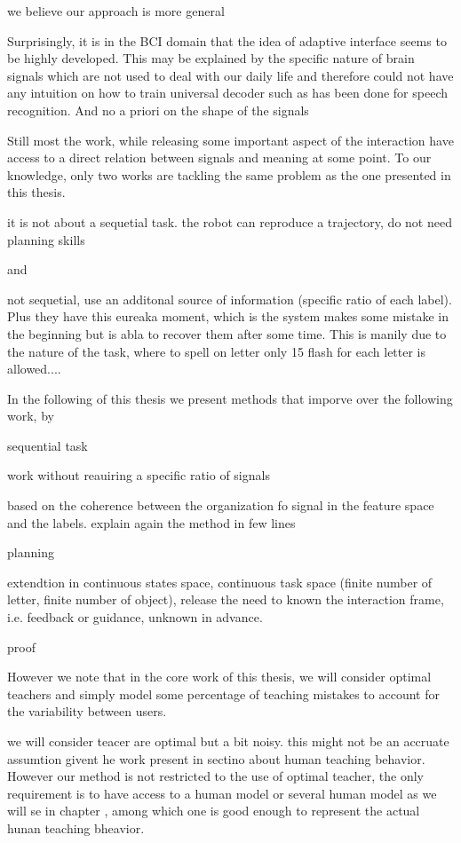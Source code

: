 we believe our approach is more general

Surprisingly, it is in the BCI domain that the idea of adaptive interface seems to be highly developed. This may be explained by the specific nature of brain signals which are not used to deal with our daily life and therefore could not have any intuition on how to train universal decoder such as has been done for speech recognition. And no a priori on the shape of the signals

Still most the work, while releasing some important aspect of the interaction have access to a direct relation between signals and meaning at some point. To our knowledge, only two works are tackling the same problem as the one presented in this thesis.

 
\cite{cederborg2011imitating}
it is not about a sequetial task. the robot can reproduce a trajectory, do not need planning skills

and

\cite{Kindermans2012a,Kindermans2012b,kindermans2014integrating} not sequetial, use an additonal source of information (specific ratio of each label). Plus they have this eureaka moment, which is the system makes some mistake in the beginning but is abla to recover them after some time. This is manily due to the nature of the task, where to spell on letter only 15 flash for each letter is allowed....

In the following of this thesis we present methods that imporve over the following work, by

sequential task

work without reauiring a specific ratio of signals

based on the coherence between the organization fo signal in the feature space and the labels. explain again the method in few lines

planning

extendtion in continuous states space, continuous task space (finite number of letter, finite number of object), release the need to known the interaction frame, i.e. feedback or guidance, unknown in advance.

proof

However we note that in the core work of this thesis, we will consider optimal teachers and simply model some percentage of teaching mistakes to account for the variability between users.


we will consider teacer are optimal but a bit noisy. this might not be an accruate assumtion givent he work present in sectino about human teaching behavior. However our method is not restricted to the use of optimal teacher, the only requirement is to have access to a human model or several human model as we will se in chapter , among which one is good enough to represent the actual hunan teaching bheavior.

